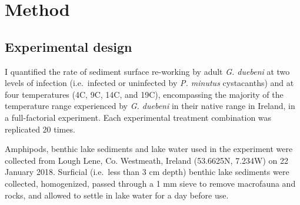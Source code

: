\section{Method}

\subsection{Experimental design}

I quantified the rate of sediment surface re-working by adult \emph{G. duebeni} at two levels of infection (i.e.\ infected or uninfected by \emph{P. minutus} cystacanths) and at four temperatures (4\degree C, 9\degree C, 14\degree C, and 19\degree C), encompassing the majority of the temperature range experienced by \emph{G. duebeni} in their native range in Ireland, in a full-factorial experiment. Each experimental treatment combination was replicated 20 times.

Amphipods, benthic lake sediments and lake water used in the experiment were collected from Lough Lene, Co. Westmeath, Ireland (53.6625\degree N, 7.234\degree W) on 22 January 2018. Surficial (i.e.\ less than 3 cm depth) benthic lake sediments were collected, homogenized, passed through a 1 mm sieve to remove macrofauna and rocks, and allowed to settle in lake water for a day before use.  

